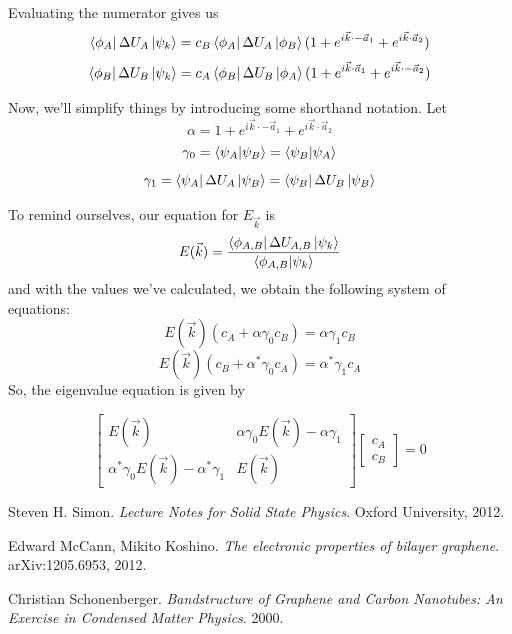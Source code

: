 \documentclass{article}
\begin{document}
Evaluating the numerator gives us
$$\bra{\phi_{A}}\Delta U_{A}\ket{\psi_{k}} = c_{B}\bra{\phi_{A}}\Delta U_{A}\ket{\phi_{B}}(1 + e^{i\vec{k}\cdot-\vec{a}_{1}} + e^{i\vec{k}\cdot\vec{a}_{2}})$$
$$\bra{\phi_{B}}\Delta U_{B}\ket{\psi_{k}} = c_{A}\bra{\phi_{B}}\Delta U_{B}\ket{\phi_{A}}(1 + e^{i\vec{k}\cdot\vec{a}_{1}} + e^{i\vec{k}\cdot-\vec{a}_{2}})$$

Now, we'll simplify things by introducing some shorthand notation. Let
$$ \alpha =  1 + e^{i\vec{k}\cdot-\vec{a}_{1}} + e^{i\vec{k}\cdot\vec{a}_{2}}$$
$$ \gamma_{0} = \bra{\psi_{A}}\ket{\psi_{B}} = \bra{\psi_{B}}\ket{\psi_{A}}$$
$$ \gamma_{1} = \bra{\psi_{A}}\Delta U_{A}\ket{\psi_{B}} = \bra{\psi_{B}}\Delta U_{B}\ket{\psi_{B}}$$

To remind ourselves, our equation for $E_{\vec{k}}$ is
$$E(\vec{k}) = \frac{\bra{\phi_{A,B}}\Delta U_{A,B}\ket{\psi_{k}}}{\bra{\phi_{A,B}}\ket{\psi_{k}}}$$
and with the values we've calculated, we obtain the following system of equations:
$$E(\vec{k})(c_{A} + \alpha\gamma_{0}c_{B}) = \alpha\gamma_{1}c_{B}$$
$$E(\vec{k})(c_{B} + \alpha^{*}\gamma_{0}c_{A}) = \alpha^{*}\gamma_{1}c_{A}$$
So, the eigenvalue equation is given by

$$
\begin{bmatrix}
E(\vec{k}) & \alpha\gamma_{0}E(\vec{k}) - \alpha\gamma_{1}\\
  \alpha^{*}\gamma_{0}E(\vec{k}) - \alpha^{*}\gamma_{1} & E(\vec{k})
\end{bmatrix}
\begin{bmatrix}
c_{A} \\
c_{B}
\end{bmatrix}
= 0
$$


\begin{thebibliography}{9}
Steven H. Simon.
\textit{Lecture Notes for Solid State Physics}.
Oxford University, 2012.

Edward McCann, Mikito Koshino.
\textit{The electronic properties of bilayer graphene}.
arXiv:1205.6953, 2012.

Christian Schonenberger.
\textit{Bandstructure of Graphene and Carbon Nanotubes: An Exercise in Condensed Matter Physics}.
2000.

\end{thebibliography}
\end{document}
